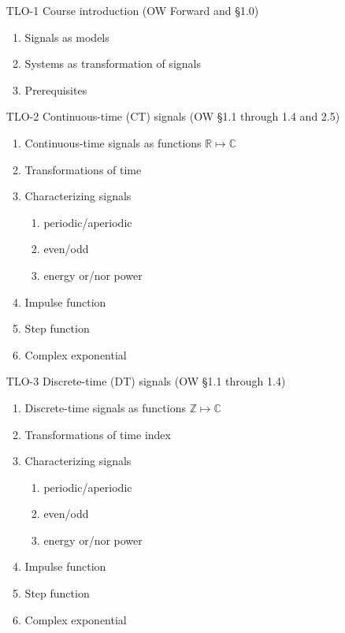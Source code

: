\begin{enumerate}
\item[TLO-1] Course introduction (OW Forward and \S 1.0)
  \begin{enumerate}
  \item Signals as models
  \item Systems as transformation of signals
  \item Prerequisites
  \end{enumerate}

\item[TLO-2] Continuous-time (CT) signals (OW \S 1.1 through 1.4 and 2.5)
  \begin{enumerate}
  \item Continuous-time signals as functions $\mathbb{R}\mapsto\mathbb{C}$
  \item Transformations of time
  \item Characterizing signals
    \begin{enumerate}
    \item periodic/aperiodic
    \item even/odd
    \item energy or/nor power
    \end{enumerate}
  \item Impulse function
  \item Step function
  \item Complex exponential
  \end{enumerate}

\item[TLO-3] Discrete-time (DT) signals (OW \S 1.1 through 1.4)
  \begin{enumerate}
  \item Discrete-time signals as functions $\mathbb{Z}\mapsto\mathbb{C}$
  \item Transformations of time index
  \item Characterizing signals
    \begin{enumerate}
    \item periodic/aperiodic
    \item even/odd
    \item energy or/nor power
    \end{enumerate}
  \item Impulse function
  \item Step function
  \item Complex exponential
  \end{enumerate}


\end{enumerate}
